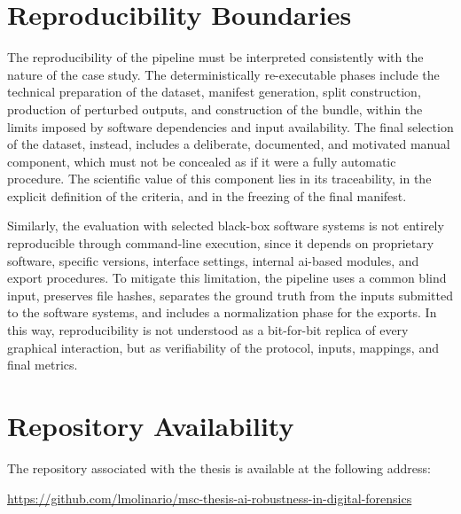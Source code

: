 \section{Reproducibility Boundaries}
\label{app:reproducibility-boundaries}

The reproducibility of the pipeline must be interpreted consistently with the
nature of the case study. The deterministically re-executable phases include the
technical preparation of the dataset, manifest generation, split construction,
production of perturbed outputs, and construction of the bundle, within the
limits imposed by software dependencies and input availability. The final
selection of the dataset, instead, includes a deliberate, documented, and
motivated manual component, which must not be concealed as if it were a fully
automatic procedure. The scientific value of this component lies in its
traceability, in the explicit definition of the criteria, and in the freezing of
the final manifest.

Similarly, the evaluation with selected black-box software systems is not
entirely reproducible through command-line execution, since it depends on
proprietary software, specific versions, interface settings, internal
\gls{ai}-based modules, and export procedures. To mitigate this limitation, the
pipeline uses a common blind input, preserves file hashes, separates the ground
truth from the inputs submitted to the software systems, and includes a
normalization phase for the exports. In this way, reproducibility is not
understood as a bit-for-bit replica of every graphical interaction, but as
verifiability of the protocol, inputs, mappings, and final metrics.


\section{Repository Availability}
\label{app:repository-availability}

The repository associated with the thesis is available at the following address:

\begin{center}
\url{https://github.com/lmolinario/msc-thesis-ai-robustness-in-digital-forensics}
\end{center}

